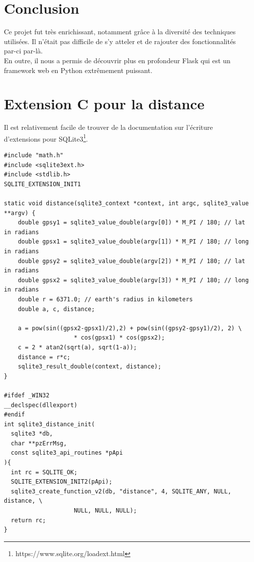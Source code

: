 \documentclass[a4paper]{article}
\begin{document}
\section{Conclusion}

Ce projet fut très enrichissant, notamment grâce à la diversité des techniques utilisées. Il n'était pas difficile de s'y atteler et de rajouter des fonctionnalités par-ci par-là.\\

En outre, il nous a permis de découvrir plus en profondeur Flask qui est un framework web en Python extrêmement puissant.

\appendix
\section{Extension C pour la distance}
\label{extension-c}
Il est relativement facile de trouver de la documentation sur l'écriture d'extensions pour SQLite3\footnote{https://www.sqlite.org/loadext.html}.

\begin{verbatim}
#include "math.h"
#include <sqlite3ext.h>
#include <stdlib.h> 
SQLITE_EXTENSION_INIT1

static void distance(sqlite3_context *context, int argc, sqlite3_value **argv) {
    double gpsy1 = sqlite3_value_double(argv[0]) * M_PI / 180; // lat in radians
    double gpsx1 = sqlite3_value_double(argv[1]) * M_PI / 180; // long in radians
    double gpsy2 = sqlite3_value_double(argv[2]) * M_PI / 180; // lat in radians
    double gpsx2 = sqlite3_value_double(argv[3]) * M_PI / 180; // long in radians
    double r = 6371.0; // earth's radius in kilometers
    double a, c, distance;

    a = pow(sin((gpsx2-gpsx1)/2),2) + pow(sin((gpsy2-gpsy1)/2), 2) \ 
                    * cos(gpsx1) * cos(gpsx2);
    c = 2 * atan2(sqrt(a), sqrt(1-a));
    distance = r*c;
    sqlite3_result_double(context, distance);
}

#ifdef _WIN32
__declspec(dllexport)
#endif
int sqlite3_distance_init(
  sqlite3 *db, 
  char **pzErrMsg, 
  const sqlite3_api_routines *pApi
){
  int rc = SQLITE_OK;
  SQLITE_EXTENSION_INIT2(pApi);
  sqlite3_create_function_v2(db, "distance", 4, SQLITE_ANY, NULL, distance, \
                    NULL, NULL, NULL);
  return rc;
}
\end{verbatim}
\end{document}
